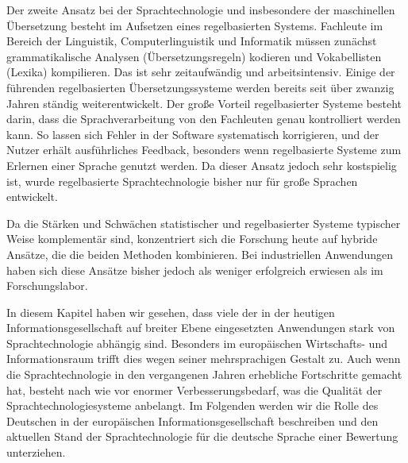 \documentclass[]{../../metanetpaper}
\begin{document}
\begin{Parallel}[c]{80mm}{80mm}
{Der zweite Ansatz bei der Sprachtechnologie und insbesondere der maschinellen Übersetzung besteht im Aufsetzen eines regelbasierten Systems. Fachleute im Bereich der Linguistik, Computerlinguistik und Informatik müssen zunächst grammatikalische Analysen (Übersetzungsregeln) kodieren und Vokabellisten (Lexika) kompilieren. Das ist sehr zeitaufwändig und arbeitsintensiv. Einige der führenden regelbasierten Übersetzungssysteme werden bereits seit über zwanzig Jahren ständig weiterentwickelt. Der große Vorteil regelbasierter Systeme besteht darin, dass die Sprachverarbeitung von den Fachleuten genau kontrolliert werden kann. So lassen sich Fehler in der Software systematisch korrigieren, und der Nutzer erhält ausführliches Feedback, besonders wenn regelbasierte Systeme zum Erlernen einer Sprache genutzt werden. Da dieser Ansatz jedoch sehr kostspielig ist, wurde regelbasierte Sprachtechnologie bisher nur für große Sprachen entwickelt. 

Da die Stärken und Schwächen statistischer und regelbasierter Systeme typischer Weise komplementär sind, konzentriert sich die Forschung heute auf hybride Ansätze, die die beiden Methoden kombinieren. Bei industriellen Anwendungen haben sich diese Ansätze bisher jedoch als weniger erfolgreich erwiesen als im Forschungslabor. 

In diesem Kapitel haben wir gesehen, dass viele der in der heutigen Informationsgesellschaft auf breiter Ebene eingesetzten Anwendungen stark von Sprachtechnologie abhängig sind. Besonders im europäischen Wirtschafts- und Informationsraum trifft dies wegen seiner mehrsprachigen Gestalt zu. Auch wenn die Sprachtechnologie in den vergangenen Jahren erhebliche Fortschritte gemacht hat, besteht nach wie vor enormer Verbesserungsbedarf, was die Qualität der Sprachtechnologiesysteme anbelangt. Im Folgenden werden wir die Rolle des Deutschen in der europäischen Informationsgesellschaft beschreiben und den aktuellen Stand der Sprachtechnologie für die deutsche Sprache einer Bewertung unterziehen.
  }

\end{Parallel}
\end{document}
